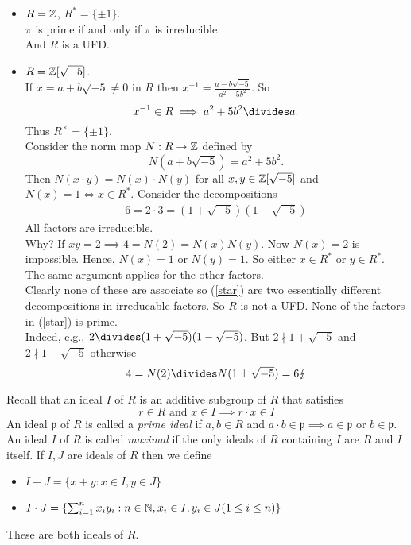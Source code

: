\documentclass[NumTh.tex]{subfiles}
\begin{document}
\begin{ex}
  \begin{itemize}
    \item $R = \mathbb{Z}$, $R^\ast = \{\pm 1\}$. \\
    $\pi$ is prime if and only if $\pi$ is irreducible. \\
    And $R$ is a UFD.
    \item $R = \mathbb{Z}[\sqrt{-5}]$. \\
    If $x = a + b \sqrt{-5} \neq 0$ in $R$ then $x^{-1} = \frac{a -b \sqrt{-5}}{a^2 + 5 b^2}$.
    So 
    \[ x^{-1} \in R \implies a^2 + 5b^2 \divides a \text{.} \]
    Thus $R^\times = \{ \pm 1\}$.\\
    Consider the norm map $N: R \to \mathbb{Z}$ defined by
    \[ N(a+b\sqrt{-5}) = a^2 + 5 b^2 \text{.} \]
    Then $N(x \cdot y) = N(x) \cdot N(y)$ for all $x,y \in \mathbb{Z}[\sqrt{-5}]$ and $N(x) = 1 \iff x \in R^\ast$.
    Consider the decompositions
    \begin{align}
      6 = 2 \cdot 3 = (1 + \sqrt{-5}) (1 - \sqrt{-5}) \label{star}
    \end{align}
    All factors are irreducible. \\
    Why?
    If $xy = 2 \implies 4 = N(2) = N(x) N(y)$.
    Now $N(x) = 2$ is impossible. Hence, $N(x) = 1$ or $N(y) = 1$.
    So either $x \in R^\ast$ or $y \in R^\ast$. \\
    The same argument applies for the other factors.\\
    Clearly none of these are associate so (\ref{star}) are two essentially different decompositions in irreducable factors.
    So $R$ is not a UFD. None of the factors in (\ref{star}) is prime.\\
    Indeed, e.g., $2 \divides (1 + \sqrt{-5})(1- \sqrt{-5})$.
    But $2 \nmid 1 + \sqrt{-5}$ and $2 \nmid 1- \sqrt{-5}$ otherwise
    \[ 4 = N(2) \divides N(1 \pm \sqrt{-5}) = 6 \lightning\]
  \end{itemize}
\end{ex}

Recall that an ideal $I$ of $R$ is an additive subgroup of $R$ that satisfies
\[ r \in R \text{ and } x \in I \implies r \cdot x \in I \]
An ideal $\mathfrak{p}$ of $R$ is called a \emph{prime ideal} if $a,b \in R$ and $a \cdot b \in \mathfrak{p} \implies a \in \mathfrak{p}$ or $b \in \mathfrak{p}$.
An ideal $I$ of $R$ is called \emph{maximal} if the only ideals of $R$ containing $I$ are $R$ and $I$ itself.
If $I,J$ are ideals of $R$ then we define
\begin{itemize}
  \item $I + J = \{ x+y : x \in I, y \in J \}$
  \item $I \cdot J = \{ \sum_{i=1}^n x_i y_i : n \in \mathbb{N}, x_i \in I, y_i \in J (1 \leq i \leq n) \}$
\end{itemize}
These are both ideals of $R$.
\end{document}
